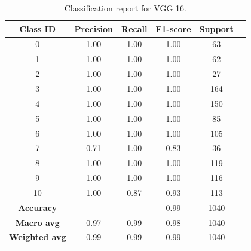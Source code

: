 \begin{table}[h]
    \centering
    \begin{tabular}{cccccc}
        \toprule
        \textbf{Class ID} & \textbf{Precision} & \textbf{Recall} & \textbf{F1-score} & \textbf{Support} \\
        \midrule
        0 & 1.00 & 1.00 & 1.00 & 63 \\
        1 & 1.00 & 1.00 & 1.00 & 62 \\
        2 & 1.00 & 1.00 & 1.00 & 27 \\
        3 & 1.00 & 1.00 & 1.00 & 164 \\
        4 & 1.00 & 1.00 & 1.00 & 150 \\
        5 & 1.00 & 1.00 & 1.00 & 85 \\
        6 & 1.00 & 1.00 & 1.00 & 105 \\
        7 & 0.71 & 1.00 & 0.83 & 36 \\
        8 & 1.00 & 1.00 & 1.00 & 119 \\
        9 & 1.00 & 1.00 & 1.00 & 116 \\
        10 & 1.00 & 0.87 & 0.93 & 113 \\
        \midrule
        \textbf{Accuracy} & & & 0.99 & 1040 \\
        \textbf{Macro avg} & 0.97 & 0.99 & 0.98 & 1040 \\
        \textbf{Weighted avg} & 0.99 & 0.99 & 0.99 & 1040 \\
        \bottomrule
    \end{tabular}
    \caption{Classification report for VGG 16.}
    \label{tab:classification_report_vgg16}
\end{table}


